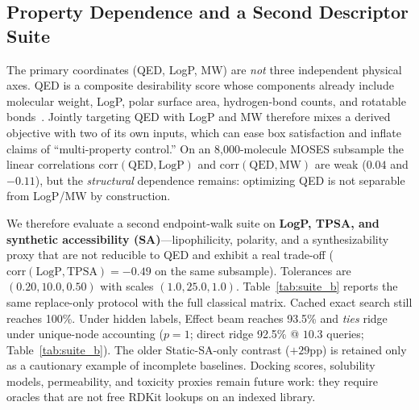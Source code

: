 \documentclass[journal=jcisd8,manuscript=article,email=false]{achemso}
\begin{document}
\subsection{Property Dependence and a Second Descriptor Suite}
\label{sec:suite_b}

The primary coordinates (QED, LogP, MW) are \emph{not} three independent physical axes. QED is a composite desirability score whose components already include molecular weight, LogP, polar surface area, hydrogen-bond counts, and rotatable bonds~\citep{bickerton2012qed}. Jointly targeting QED with LogP and MW therefore mixes a derived objective with two of its own inputs, which can ease box satisfaction and inflate claims of ``multi-property control.'' On an 8{,}000-molecule MOSES subsample the linear correlations $\mathrm{corr}(\mathrm{QED},\mathrm{LogP})$ and $\mathrm{corr}(\mathrm{QED},\mathrm{MW})$ are weak ($0.04$ and $-0.11$), but the \emph{structural} dependence remains: optimizing QED is not separable from LogP/MW by construction.

We therefore evaluate a second endpoint-walk suite on \textbf{LogP, TPSA, and synthetic accessibility (SA)}---lipophilicity, polarity, and a synthesizability proxy that are not reducible to QED and exhibit a real trade-off ($\mathrm{corr}(\mathrm{LogP},\mathrm{TPSA}){=}-0.49$ on the same subsample). Tolerances are $(0.20,10.0,0.50)$ with scales $(1.0,25.0,1.0)$. Table~\ref{tab:suite_b} reports the same replace-only protocol with the full classical matrix. Cached exact search still reaches 100\%. Under hidden labels, Effect beam reaches 93.5\% and \emph{ties} ridge under unique-node accounting ($p{=}1$; direct ridge 92.5\% @ $10.3$ queries; Table~\ref{tab:suite_b}). The older Static-SA-only contrast ($+29$pp) is retained only as a cautionary example of incomplete baselines. Docking scores, solubility models, permeability, and toxicity proxies remain future work: they require oracles that are not free RDKit lookups on an indexed library.
\end{document}
